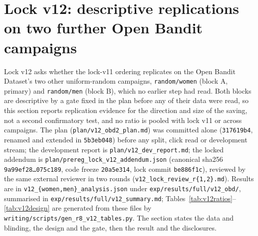 \documentclass[sigconf,anonymous,review]{acmart}
\begin{document}
\section{Lock v12: descriptive replications on two further Open Bandit campaigns}\label{app:v12}

Lock v12 asks whether the lock-v11 ordering replicates on the Open Bandit Dataset's two other uniform-random campaigns, \texttt{random/women} (block A, primary) and \texttt{random/men} (block B), which no earlier step had read. Both blocks are descriptive by a gate fixed in the plan before any of their data were read, so this section reports replication evidence for the direction and size of the saving, not a second confirmatory test, and no ratio is pooled with lock v11 or across campaigns. The plan (\texttt{plan/v12\_obd2\_plan.md}) was committed alone (\texttt{317619b4}, renamed and extended in \texttt{5b3eb048}) before any split, click read or development stream; the development report is \texttt{plan/v12\_dev\_report.md}; the locked addendum is \texttt{plan/prereg\_lock\_v12\_addendum.json} (canonical sha256 \texttt{9a99ef28\ldots 075c189}, code freeze \texttt{20a5e314}, lock commit \texttt{be886f1c}), reviewed by the same external reviewer in two rounds (\texttt{v12\_lock\_review\_r\{1,2\}.md}). Results are in \texttt{v12\_\{women,men\}\_analysis.json} under \texttt{exp/results/full/v12\_obd/}, summarised in \texttt{exp/results/full/v12\_summary.md}; Tables~\ref{tab:v12ratios}--\ref{tab:v12design} are generated from these files by \texttt{writing/scripts/gen\_r8\_v12\_tables.py}. The section states the data and blinding, the design and the gate, then the result and the disclosures.




\end{document}
